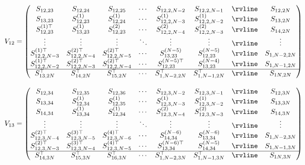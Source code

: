 \begin{appendices}
\begin{align}
    \label{eq:ch3_QSD-V_12}
    V_{12} =
    \begin{pmatrix}
        S_{12,23} & S_{12,24} & S_{12,25} & \cdots & S_{12,2,N-2} & S_{12,2,N-1} & \rvline & S_{12,2N} \\
        S_{13,23} & S_{12,23}^{(1)} & S_{12,24}^{(1)} & \cdots & S_{12,2,N-3}^{(1)} & S_{12,2,N-2}^{(1)} & \rvline & S_{13,2N} \\
        S_{12,23}^{(1)\top} & S_{13,23}^{(1)} & S_{12,23}^{(2)} & \cdots & S_{12,2,N-4}^{(2)} & S_{12,2,N-3}^{(2)} & \rvline & S_{14,2N} \\
        \vdots & \vdots & \vdots & \ddots & \vdots & \vdots & \rvline & \vdots \\
        S_{12,2,N-3}^{(1)\top} & S_{12,2,N-4}^{(2)\top} & S_{12,2,N-5}^{(2)\top} & \cdots & S_{13,23}^{(N-5)} & S_{12,23}^{(N-5)} & \rvline & S_{1,N-2,2N} \\
        S_{12,2,N-2}^{(1)\top} & S_{12,2,N-3}^{(2)\top} & S_{12,2,N-4}^{(2)\top} & \cdots & S_{12,23}^{(N-5)\top} & S_{13,23}^{(N-4)} & \rvline & S_{1,N-1,2N} \\
        \hline
        S_{13,2N}^\top & S_{14,2N}^\top & S_{15,2N}^\top & \cdots & S_{1,N-2,2N}^\top & S_{1,N-1,2N}^\top & \rvline & S_{1N,2N}
    \end{pmatrix}
\end{align}

\begin{align}
    \label{eq:ch3_QSD-V_13}
    V_{13} = 
    \begin{pmatrix}
        S_{12,34} & S_{12,35} & S_{12,36} & \cdots & S_{12,3,N-2} & S_{12,3,N-1} & \rvline & S_{12,3N} \\
        S_{13,34} & S_{12,34}^{(1)} & S_{12,35}^{(1)} & \cdots & S_{12,3,N-3}^{(1)} & S_{12,3,N-2}^{(1)} & \rvline & S_{13,3N} \\
        S_{14,34} & S_{13,34}^{(1)} & S_{12,34}^{(1)} & \cdots & S_{12,3,N-4}^{(2)} & S_{12,3,N-3}^{(2)} & \rvline & S_{14,3N} \\
        \vdots & \vdots & \vdots & \ddots & \vdots & \vdots & \rvline & \vdots \\
        S_{12,3,N-4}^{(2)\top} & S_{12,3,N-5}^{(3)\top} & S_{12,3,N-6}^{(4)\top} & \cdots & S_{14,34}^{(N-6)} & S_{13,34}^{(N-6)} & \rvline & S_{1,N-2,3N} \\
        S_{12,3,N-3}^{(2)\top} & S_{12,3,N-4}^{(3)\top} & S_{12,3,N-5}^{(4)\top} & \cdots & S_{13,34}^{(N-6)\top} & S_{14,34}^{(N-5)} & \rvline & S_{1,N-1,3N} \\
        \hline
        S_{14,3N}^\top & S_{15,3N}^\top & S_{16,3N}^\top & \cdots & S_{1,N-2,3N}^\top & S_{1,N-1,3N}^\top & \rvline & S_{1N,3N}
    \end{pmatrix}
\end{align}


\end{appendices}
